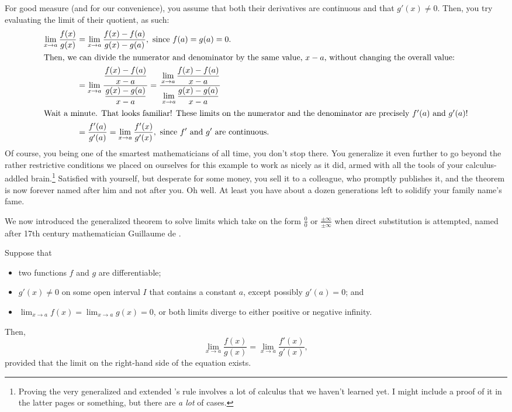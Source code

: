 For good measure (and for our convenience), you assume that both their derivatives are continuous and that \(g'(x) \neq 0\). Then, you try evaluating the limit of their quotient, as such:\begin{align*}
    \lim_{x\to a} \frac{f(x)}{g(x)} &= \lim_{x\to a} \frac{f(x) - f(a)}{g(x) - g(a)},~\text{since \(f(a) = g(a) = 0\).}\\
    \intertext{Then, we can divide the numerator and denominator by the same value, \(x - a\), without changing the overall value:} 
    &= \lim_{x \to a} \frac{\dfrac{f(x) - f(a)}{x-a}}{\dfrac{g(x) - g(a)}{x - a}} = \frac{\displaystyle{} \lim_{x\to a} \frac{f(x) - f(a)}{x-a}}{\displaystyle{} \lim_{x\to a} \frac{g(x) - g(a)}{x-a}}\\ 
    \intertext{Wait a minute. That looks familiar! These limits on the numerator and the denominator are precisely \(f'(a)\) and \(g'(a)\)!}
    &= \frac{f'(a)}{g'(a)} = \lim_{x \to a} \frac{f'(x)}{g'(x)},~\text{since \(f'\) and \(g'\) are continuous.} 
\end{align*}
Of course, you being one of the smartest mathematicians of all time, you don't stop there. You generalize it even further to go beyond the rather restrictive conditions 
we placed on ourselves for this example to work as nicely as it did, armed with all the tools of your calculus-addled brain.\footnote{Proving the very generalized and 
extended \lh's rule involves a lot of calculus that we haven't learned yet. I might include a proof of it in the latter pages or something, but there are \textit{a lot} of cases.} 
Satisfied with yourself, but desperate for some money, you sell it to a colleague, who promptly publishes it, and the theorem is now forever named after him and not after you. 
Oh well. At least you have about a dozen generations left to solidify your family name's fame.\par 
We now introduced the generalized theorem to solve limits which take on the form \(\frac{0}{0}\) or \(\frac{\pm \infty}{\pm \infty}\) when direct substitution is attempted, named after
17th century mathematician Guillaume de \lh.
\begin{theo}[\lh's rule]
Suppose that\begin{itemize}
    \item two functions \(f\) and \(g\) are differentiable;
    \item \(g'(x) \neq 0 \) on some open interval \(I\) that contains a constant \(a\), except
possibly \(g'(a) = 0\); and 
    \item \(\lim_{x\to a} f(x) = \lim_{x\to a} g(x) = 0\), or both limits diverge to either positive or negative infinity.
\end{itemize} Then,\[
    \lim_{x\to a} \frac{f(x)}{g(x)} = \lim_{x\to a} \frac{f'(x)}{g'(x)}, 
\] provided that the limit on the right-hand side of the equation exists. 
\end{theo}
